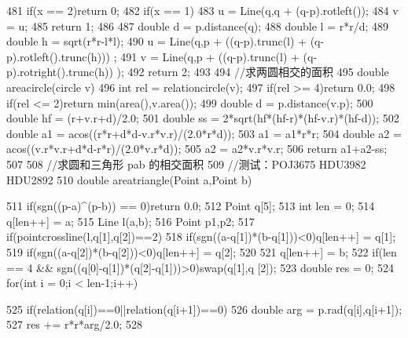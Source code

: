 \documentclass[11pt]{article}
\begin{document}
\begin{Code}
{{481              if(x == 2)return 0;
482              if(x == 1){
483                   u = Line(q,q + (q-p).rotleft());
484                   v = u;
485                   return 1;
486              }
487              double d = p.distance(q);
488              double l = r*r/d;
489              double h = sqrt(r*r-l*l);
490              u = Line(q,p + ((q-p).trunc(l) + (q-p).rotleft().trunc(h)))
                    ;
491              v = Line(q,p + ((q-p).trunc(l) + (q-p).rotright().trunc(h))
                    );
492              return 2;
493       }
494       //求两圆相交的面积
495       double areacircle(circle v){
496           int rel = relationcircle(v);
497           if(rel >= 4)return 0.0;
498           if(rel <= 2)return min(area(),v.area());
499           double d = p.distance(v.p);
500           double hf = (r+v.r+d)/2.0;
501           double ss = 2*sqrt(hf*(hf-r)*(hf-v.r)*(hf-d));
502           double a1 = acos((r*r+d*d-v.r*v.r)/(2.0*r*d));
503           a1 = a1*r*r;
504           double a2 = acos((v.r*v.r+d*d-r*r)/(2.0*v.r*d));
505           a2 = a2*v.r*v.r;
506           return a1+a2-ss;
507       }
508       //求圆和三角形 pab 的相交面积
509       //测试：POJ3675 HDU3982 HDU2892
510       double areatriangle(Point a,Point b){
511           if(sgn((p-a)^(p-b)) == 0)return 0.0;
512           Point q[5];
513           int len = 0;
514           q[len++] = a;
515           Line l(a,b);
516           Point p1,p2;
517           if(pointcrossline(l,q[1],q[2])==2){
518               if(sgn((a-q[1])*(b-q[1]))<0)q[len++] = q[1];
519               if(sgn((a-q[2])*(b-q[2]))<0)q[len++] = q[2];
520           }
521           q[len++] = b;
522           if(len == 4 && sgn((q[0]-q[1])*(q[2]-q[1]))>0)swap(q[1],q
                 [2]);
523           double res = 0;
524           for(int i = 0;i < len-1;i++){
525               if(relation(q[i])==0||relation(q[i+1])==0){
526                    double arg = p.rad(q[i],q[i+1]);
527                    res += r*r*arg/2.0;
528               }


}}}
\end{Code}
\end{document}
